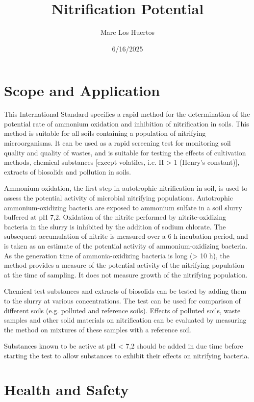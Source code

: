 \documentclass[12pt]{SOP5_beta}\usepackage[]{graphicx}\usepackage[]{xcolor}
\title{Nitrification Potential}
\date{6/16/2025}
\author{Marc Los Huertos}
\begin{document}
\maketitle

\section{Scope and Application}

\NP This International Standard specifies a rapid method for the determination of the potential rate of ammonium oxidation and inhibition of nitrification in soils. This method is suitable for all soils containing a population of nitrifying microorganisms. It can be used as a rapid screening test for monitoring soil quality and quality of wastes, and is suitable for testing the effects of cultivation methods, chemical substances [except volatiles, i.e. H > 1 (Henry's constant)], extracts of biosolids and pollution in soils.

\NP Ammonium oxidation, the first step in autotrophic nitrification in soil, is used to assess the potential activity of microbial nitrifying populations. Autotrophic ammonium-oxidizing bacteria are exposed to ammonium sulfate in a soil slurry buffered at pH 7,2. Oxidation of the nitrite performed by nitrite-oxidizing bacteria in the slurry is inhibited by the addition of sodium chlorate. The subsequent accumulation of nitrite is measured over a 6 h incubation period, and is taken as an estimate of the potential activity of ammonium-oxidizing bacteria. As the generation time of ammonia-oxidizing bacteria is long (> 10 h), the method provides a measure of the potential activity of the nitrifying population at the time of sampling. It does not measure growth of the nitrifying population. 

\NP Chemical test substances and extracts of biosolids can be tested by adding them to the slurry at various concentrations. The test can be used for comparison of different soils (e.g. polluted and reference soils). Effects of polluted soils, waste samples and other solid materials on nitrification can be evaluated by measuring the method on mixtures of these samples with a reference soil. 

\NP Substances known to be active at pH < 7,2 should be added in due time before starting the test to allow substances to exhibit their effects on nitrifying bacteria.

\section{Health and Safety}
\end{document}
